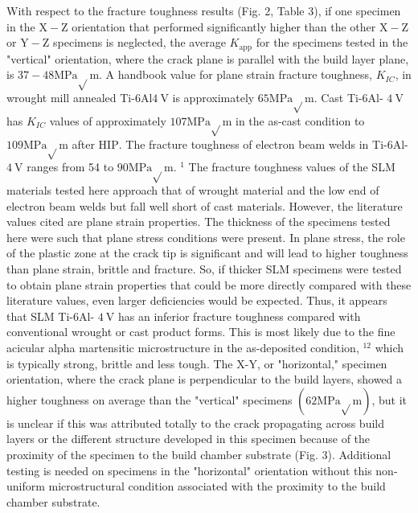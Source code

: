 \documentclass[10pt]{article}
\begin{document}
With respect to the fracture toughness results (Fig. 2, Table 3), if one specimen in the $\mathrm{X}-\mathrm{Z}$ orientation that performed significantly higher than the other $\mathrm{X}-\mathrm{Z}$ or $\mathrm{Y}-\mathrm{Z}$ specimens is neglected, the average $K_{\mathrm{app}}$ for the specimens tested in the "vertical" orientation, where the crack plane is parallel with the build layer plane, is $37-48 \mathrm{MPa} \sqrt{ } \mathrm{m}$. A handbook value for plane strain fracture toughness, $K_{I C}$, in wrought mill annealed Ti-6Al$4 \mathrm{~V}$ is approximately $65 \mathrm{MPa} \sqrt{ } \mathrm{m}$. Cast Ti-6Al- $4 \mathrm{~V}$ has $K_{I C}$ values of approximately $107 \mathrm{MPa} \sqrt{ } \mathrm{m}$ in the as-cast condition to $109 \mathrm{MPa} \sqrt{ } \mathrm{m}$ after $\mathrm{HIP}$. The fracture toughness of electron beam welds in Ti-6Al- $4 \mathrm{~V}$ ranges from 54 to $90 \mathrm{MPa} \sqrt{ } \mathrm{m}$. ${ }^{1}$ The fracture toughness values of the SLM materials tested here approach that of wrought material and the low end of electron beam welds but fall well short of cast materials. However, the literature values cited are plane strain properties. The thickness of the specimens tested here were such that plane stress conditions were present. In plane stress, the role of the plastic zone at the crack tip is significant and will lead to higher toughness than plane strain, brittle and fracture. So, if thicker SLM specimens were tested to obtain plane strain properties that could be more directly compared with these literature values, even larger deficiencies would be expected. Thus, it appears that SLM Ti-6Al- $4 \mathrm{~V}$ has an inferior fracture toughness compared with conventional wrought or cast product forms. This is most likely due to the fine acicular alpha martensitic microstructure in the as-deposited condition, ${ }^{12}$ which is typically strong, brittle and less tough. The X-Y, or "horizontal," specimen orientation, where the crack plane is perpendicular to the build layers, showed a higher toughness on average than the "vertical" specimens $(62 \mathrm{MPa} \sqrt{ } \mathrm{m})$, but it is unclear if this was attributed totally to the crack propagating across build layers or the different structure developed in this specimen because of the proximity of the specimen to the build chamber substrate (Fig. 3). Additional testing is needed on specimens in the "horizontal" orientation without this non-uniform microstructural condition associated with the proximity to the build chamber substrate.
\end{document}
